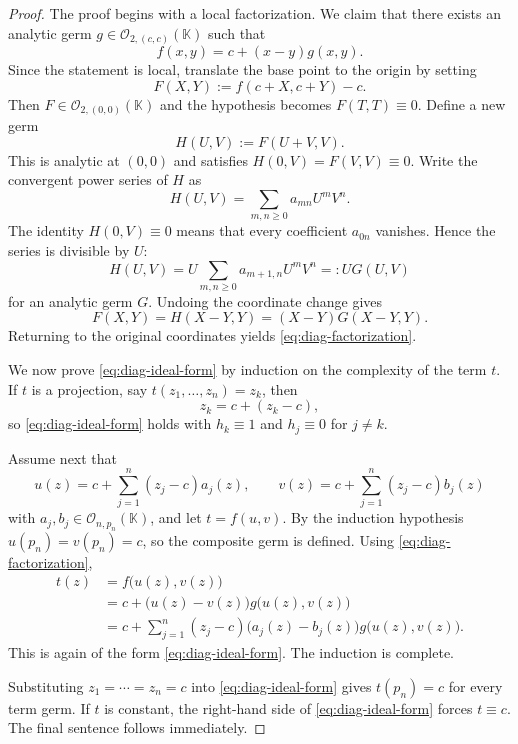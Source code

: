\documentclass[11pt]{amsart}
\numberwithin{equation}{section}
\theoremstyle{remark}
\theoremstyle{definition}
\newcommand{\K}{\mathbb{K}}
\newcommand{\Oc}{\mathcal{O}}
\begin{document}
\begin{proof}
The proof begins with a local factorization. We claim that there exists an analytic germ $g\in \Oc_{2,(c,c)}(\K)$ such that
\begin{equation}\label{eq:diag-factorization}
f(x,y)=c+(x-y)g(x,y).
\end{equation}
Since the statement is local, translate the base point to the origin by setting
\[
F(X,Y):=f(c+X,c+Y)-c.
\]
Then $F\in \Oc_{2,(0,0)}(\K)$ and the hypothesis becomes $F(T,T)\equiv 0$. Define a new germ
\[
H(U,V):=F(U+V,V).
\]
This is analytic at $(0,0)$ and satisfies $H(0,V)=F(V,V)\equiv 0$. Write the convergent power series of $H$ as
\[
H(U,V)=\sum_{m,n\geq 0} a_{mn}U^mV^n.
\]
The identity $H(0,V)\equiv 0$ means that every coefficient $a_{0n}$ vanishes. Hence the series is divisible by $U$:
\[
H(U,V)=U\sum_{m,n\geq 0} a_{m+1,n}U^mV^n=:UG(U,V)
\]
for an analytic germ $G$. Undoing the coordinate change gives
\[
F(X,Y)=H(X-Y,Y)=(X-Y)G(X-Y,Y).
\]
Returning to the original coordinates yields \eqref{eq:diag-factorization}.

We now prove \eqref{eq:diag-ideal-form} by induction on the complexity of the term $t$. If $t$ is a projection, say $t(z_1,\dots,z_n)=z_k$, then
\[
z_k=c+(z_k-c),
\]
so \eqref{eq:diag-ideal-form} holds with $h_k\equiv 1$ and $h_j\equiv 0$ for $j\neq k$.

Assume next that
\[
u(z)=c+\sum_{j=1}^n (z_j-c)a_j(z),\qquad v(z)=c+\sum_{j=1}^n (z_j-c)b_j(z)
\]
with $a_j,b_j\in \Oc_{n,p_n}(\K)$, and let $t=f(u,v)$. By the induction hypothesis $u(p_n)=v(p_n)=c$, so the composite germ is defined. Using \eqref{eq:diag-factorization},
\begin{align*}
t(z)
&=f\bigl(u(z),v(z)\bigr) \\
&=c+\bigl(u(z)-v(z)\bigr)g\bigl(u(z),v(z)\bigr) \\
&=c+\sum_{j=1}^n (z_j-c)\bigl(a_j(z)-b_j(z)\bigr)g\bigl(u(z),v(z)\bigr).
\end{align*}
This is again of the form \eqref{eq:diag-ideal-form}. The induction is complete.

Substituting $z_1=\cdots=z_n=c$ into \eqref{eq:diag-ideal-form} gives $t(p_n)=c$ for every term germ. If $t$ is constant, the right-hand side of \eqref{eq:diag-ideal-form} forces $t\equiv c$. The final sentence follows immediately.
\end{proof}
\end{document}
